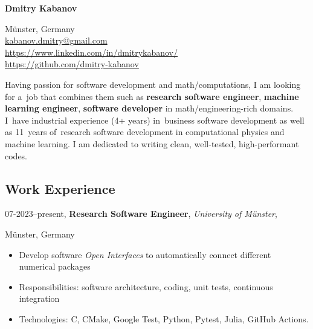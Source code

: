 \documentclass[11pt,a4paper]{article}
\renewcommand{\section}[1]{%
\begin{minipage}{\textwidth}
\vspace{1em}
\subsection*{#1 \hrulefill}
\vspace{\parskip}
\end{minipage}
}
\newcommand{\header}[4]{%
#1,
\textbf{#2},
\emph{#3},
#4
}
\begin{document}
\begin{minipage}[t]{0.5\textwidth}
\vspace{-3em}
{\Huge \textbf{Dmitry Kabanov}}
\end{minipage}%
\begin{minipage}{0.5\textwidth}
\begin{flushright}
Münster, Germany\\
\url{kabanov.dmitry@gmail.com}\\
\url{https://www.linkedin.com/in/dmitrykabanov/}\\
\url{https://github.com/dmitry-kabanov}
\end{flushright}
\end{minipage}


\vspace{0.5em}
Having passion for software development and math/computations, I am looking
for a~job that combines them such as \textbf{research software engineer},
\textbf{machine learning engineer},
\textbf{software developer} in math/engineering-rich domains.
I~have industrial experience (4+ years) in~business software development
as well as 11~years of~research software development in computational physics
and machine learning.
I am dedicated to writing clean, well-tested, high-performant codes.


\section{Work Experience}
\header{
  07-2023--present}{
  Research Software Engineer}{
  University of Münster}{
  Münster, Germany}

\begin{itemize}
  \item Develop software \emph{Open Interfaces} to automatically connect
        different numerical packages
  \item Responsibilities: software architecture, coding, unit tests, continuous integration
  \item Technologies: C, CMake, Google Test, Python, Pytest, Julia,
        GitHub Actions.
\end{itemize}
\end{document}
